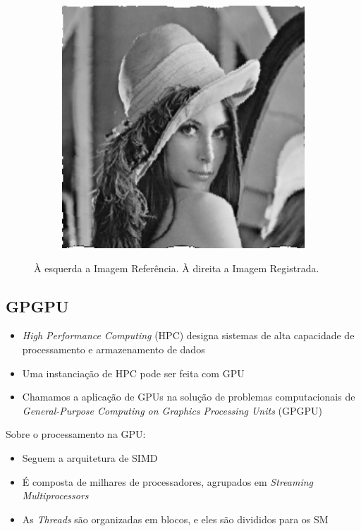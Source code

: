 \documentclass[t]{beamer}
\begin{document}
\begin{frame}
\begin{figure}[H]
\begin{subfigure}[b]{0.49\textwidth}
      \includegraphics[width=1\textwidth]{figuras/lenaRegistrada.png}
    \end{subfigure}
    \caption{À esquerda a Imagem Referência. À direita a Imagem Registrada.}
  \end{figure}
\end{frame}

\subsection{GPGPU}

\begin{frame}
  \begin{itemize}
    \item \textit{High Performance Computing} (HPC) designa sistemas de alta capacidade de processamento e armazenamento
          de dados
    \item Uma instanciação de HPC pode ser feita com GPU
    \item Chamamos a aplicação de GPUs na solução de problemas computacionais de \textit{General-Purpose Computing on Graphics 
          Processing Units} (GPGPU)
  \end{itemize}
\end{frame}

\begin{frame}
  Sobre o processamento na GPU:
  \begin{itemize}
    \item Seguem a arquitetura de SIMD
    \item É composta de milhares de processadores, agrupados em \textit{Streaming Multiprocessors}
    \item As \textit{Threads} são organizadas em blocos, e eles são divididos para os SM
  \end{itemize}
\end{frame}
\end{document}
